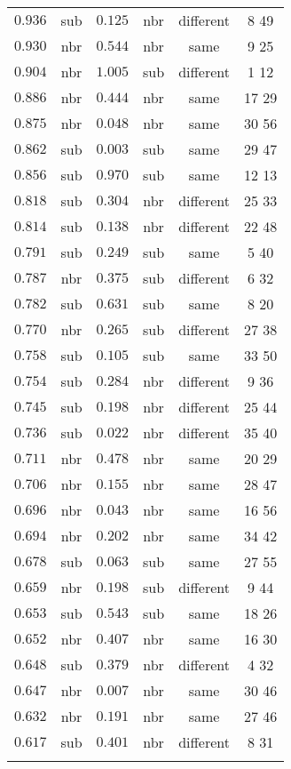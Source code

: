 \begin{table}[!htbp]
\begin{tabular}{@{\extracolsep{5pt}} cccccc}
$0.936$ & sub & $0.125$ & nbr & different & 8 49  \\ 
$0.930$ & nbr & $0.544$ & nbr & same & 9 25  \\ 
$0.904$ & nbr & $1.005$ & sub & different & 1 12  \\ 
$0.886$ & nbr & $0.444$ & nbr & same & 17 29  \\ 
$0.875$ & nbr & $0.048$ & nbr & same & 30 56  \\ 
$0.862$ & sub & $0.003$ & sub & same & 29 47  \\ 
$0.856$ & sub & $0.970$ & sub & same & 12 13  \\ 
$0.818$ & sub & $0.304$ & nbr & different & 25 33  \\ 
$0.814$ & sub & $0.138$ & nbr & different & 22 48  \\ 
$0.791$ & sub & $0.249$ & sub & same & 5 40  \\ 
$0.787$ & nbr & $0.375$ & sub & different & 6 32  \\ 
$0.782$ & sub & $0.631$ & sub & same & 8 20  \\ 
$0.770$ & nbr & $0.265$ & sub & different & 27 38  \\ 
$0.758$ & sub & $0.105$ & sub & same & 33 50  \\ 
$0.754$ & sub & $0.284$ & nbr & different & 9 36  \\ 
$0.745$ & sub & $0.198$ & nbr & different & 25 44  \\ 
$0.736$ & sub & $0.022$ & nbr & different & 35 40  \\ 
$0.711$ & nbr & $0.478$ & nbr & same & 20 29  \\ 
$0.706$ & nbr & $0.155$ & nbr & same & 28 47  \\ 
$0.696$ & nbr & $0.043$ & nbr & same & 16 56  \\ 
$0.694$ & nbr & $0.202$ & nbr & same & 34 42  \\ 
$0.678$ & sub & $0.063$ & sub & same & 27 55  \\ 
$0.659$ & nbr & $0.198$ & sub & different & 9 44  \\ 
$0.653$ & sub & $0.543$ & sub & same & 18 26  \\ 
$0.652$ & nbr & $0.407$ & nbr & same & 16 30  \\ 
$0.648$ & sub & $0.379$ & nbr & different & 4 32  \\ 
$0.647$ & nbr & $0.007$ & nbr & same & 30 46  \\ 
$0.632$ & nbr & $0.191$ & nbr & same & 27 46  \\ 
$0.617$ & sub & $0.401$ & nbr & different & 8 31  \\ 
\hline \\[-1.8ex] 
\end{tabular} 
\end{table} 

